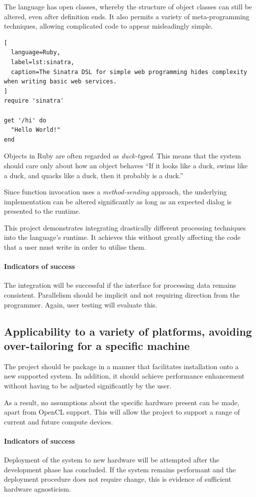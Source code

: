 The language has open classes, whereby the structure of object classes can still be altered, even after definition ends. It also permits a variety of meta-programming techniques, allowing complicated code to appear misleadingly simple.

\begin{lstlisting}[
  language=Ruby,
  label=lst:sinatra,
  caption=The Sinatra DSL for simple web programming hides complexity when writing basic web services.
]
require 'sinatra'

get '/hi' do
  "Hello World!"
end
\end{lstlisting}

Objects in Ruby are often regarded as \emph{duck-typed}. This means that the system should care only about how an object behaves \textemdash{} ``If it looks like a duck, swims like a duck, and quacks like a duck, then it probably is a duck.''\cite{ducktest}

Since function invocation uses a \emph{method-sending} approach, the underlying implementation can be altered significantly as long as an expected dialog is presented to the runtime.

This project demonstrates integrating drastically different processing techniques into the language's runtime. It achieves this without greatly affecting the code that a user must write in order to utilise them.

\paragraph{Indicators of success}
The integration will be successful if the interface for processing data remains consistent. Parallelism should be implicit and not requiring direction from the programmer. Again, user testing will evaluate this.

\subsection{Applicability to a variety of platforms, avoiding over-tailoring for a specific machine}
The project should be package in a manner that facilitates installation onto a new supported system. In addition, it should achieve performance enhancement without having to be adjusted significantly by the user.

As a result, no assumptions about the specific hardware present can be made, apart from \ac{OpenCL} support. This will allow the project to support a range of current and future compute devices.

\paragraph{Indicators of success}
Deployment of the system to new hardware will be attempted after the development phase has concluded. If the system remains performant and the deployment procedure does not require change, this is evidence of sufficient hardware agnosticism.
